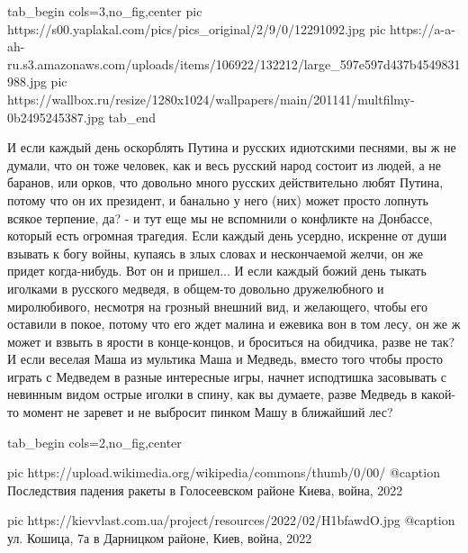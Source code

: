 \ifcmt
  tab_begin cols=3,no_fig,center
     pic https://s00.yaplakal.com/pics/pics_original/2/9/0/12291092.jpg
     pic https://a-a-ah-ru.s3.amazonaws.com/uploads/items/106922/132212/large_597e597d437b4549831988.jpg
     pic https://wallbox.ru/resize/1280x1024/wallpapers/main/201141/multfilmy-0b2495245387.jpg
  tab_end
\fi

И если каждый день оскорблять Путина и русских идиотскими песнями, вы ж не
думали, что он тоже человек, как и весь русский народ состоит из людей, а не
баранов, или орков, что довольно много русских действительно любят Путина,
потому что он их президент, и банально у него (них) может просто лопнуть всякое
терпение, да? -  и тут еще мы не вспомнили о конфликте на Донбассе, который
есть огромная трагедия. Если каждый день усердно, искренне от души взывать к
богу войны, купаясь в злых словах и нескончаемой желчи, он же придет
когда-нибудь. Вот он и пришел... И если каждый божий день тыкать иголками в
русского медведя, в общем-то довольно дружелюбного и миролюбивого, несмотря на
грозный внешний вид, и желающего, чтобы его оставили в покое, потому что его
ждет малина и ежевика вон в том лесу, он же ж может и взвыть в ярости в
конце-концов, и броситься на обидчика, разве не так? И если веселая Маша из
мультика Маша и Медведь, вместо того чтобы просто играть с Медведем в разные
интересные игры, начнет исподтишка засовывать с невинным видом острые иголки в
спину, как вы думаете, разве Медведь в какой-то момент не заревет и не выбросит
пинком Машу в ближайший лес?

\ifcmt
  tab_begin cols=2,no_fig,center

     pic https://upload.wikimedia.org/wikipedia/commons/thumb/0/00/%
     @caption Последствия падения ракеты в Голосеевском районе Киева, война, 2022
     
     pic https://kievvlast.com.ua/project/resources/2022/02/H1bfawdO.jpg
     @caption ул. Кошица, 7а в Дарницком районе, Киев, война, 2022

